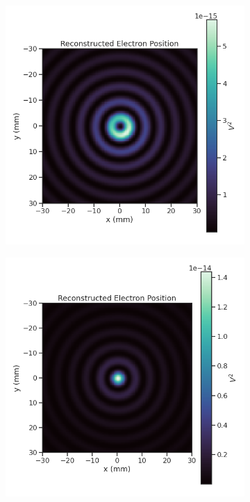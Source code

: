 \begin{figure}[htbp]
    \centering
    \begin{subfigure}{0.45\textwidth}
        \includegraphics[width=\textwidth]{figs/Chapter-4/230518_locust_bf_onaxis_no_cyclotron.png}
        \caption{\label{fig:chap4-bf-no-cyc-phase-ex}}
    \end{subfigure}
    \hfill
    \begin{subfigure}{0.45\textwidth}
        \includegraphics[width=\textwidth]{figs/Chapter-4/230518_locust_bf_onaxis.png}

\end{subfigure}
\end{figure}
